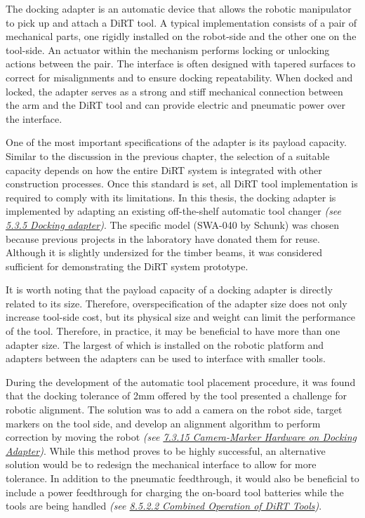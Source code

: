 \documentclass[11pt]{book}
\begin{document}
The docking adapter is an automatic device that allows the robotic manipulator to pick up and attach a DiRT tool. A typical implementation consists of a pair of mechanical parts, one rigidly installed on the robot-side and the other one on the tool-side. An actuator within the mechanism performs locking or unlocking actions between the pair. The interface is often designed with tapered surfaces to correct for misalignments and to ensure docking repeatability. When docked and locked, the adapter serves as a strong and stiff mechanical connection between the arm and the DiRT tool and can provide electric and pneumatic power over the interface.

One of the most important specifications of the adapter is its payload capacity. Similar to the discussion in the previous chapter, the selection of a suitable capacity depends on how the entire DiRT system is integrated with other construction processes. Once this standard is set, all DiRT tool implementation is required to comply with its limitations. In this thesis, the docking adapter is implemented by adapting an existing off-the-shelf automatic tool changer \textit{(see \uline{5.3.5 Docking adapter})}. The specific model (SWA-040 by Schunk) was chosen because previous projects in the laboratory have donated them for reuse. Although it is slightly undersized for the timber beams, it was considered sufficient for demonstrating the DiRT system prototype. 

It is worth noting that the payload capacity of a docking adapter is directly related to its size. Therefore, overspecification of the adapter size does not only increase tool-side cost, but its physical size and weight can limit the performance of the tool. Therefore, in practice, it may be beneficial to have more than one adapter size. The largest of which is installed on the robotic platform and adapters between the adapters can be used to interface with smaller tools.

During the development of the automatic tool placement procedure, it was found that the docking tolerance of 2mm offered by the tool presented a challenge for robotic alignment. The solution was to add a camera on the robot side, target markers on the tool side, and develop an alignment algorithm to perform correction by moving the robot \textit{(see \uline{7.3.15 Camera-Marker Hardware on Docking Adapter})}. While this method proves to be highly successful, an alternative solution would be to redesign the mechanical interface to allow for more tolerance. In addition to the pneumatic feedthrough, it would also be beneficial to include a power feedthrough for charging the on-board tool batteries while the tools are being handled \textit{(see \uline{8.5.2.2 Combined Operation of DiRT Tools})}. 
\end{document}

